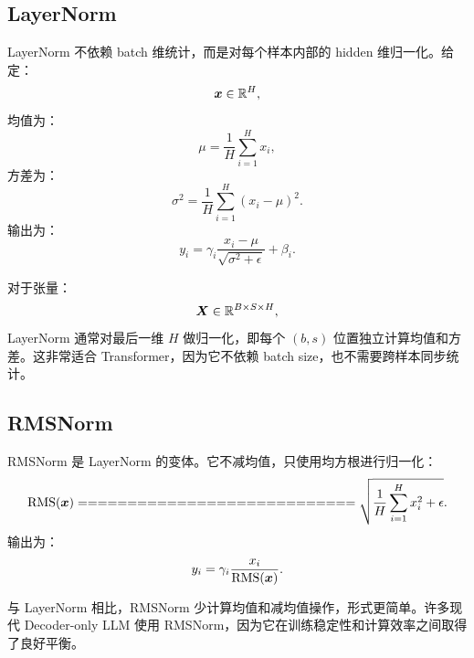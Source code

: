 \subsection{LayerNorm}
\label{subsec:layernorm}

LayerNorm 不依赖 batch 维统计，而是对每个样本内部的 hidden 维归一化。给定：
\[
\bm{x}\in\mathbb{R}^{H},
\]
均值为：
\[
\mu=\frac{1}{H}\sum_{i=1}^{H}x_i,
\]
方差为：
\[
\sigma^2=\frac{1}{H}\sum_{i=1}^{H}(x_i-\mu)^2.
\]
输出为：
\[
y_i=\gamma_i\frac{x_i-\mu}{\sqrt{\sigma^2+\epsilon}}+\beta_i.
\]

对于张量：
\[
\bm{X}\in\mathbb{R}^{B\times S\times H},
\]
LayerNorm 通常对最后一维 $H$ 做归一化，即每个 $(b,s)$ 位置独立计算均值和方差。这非常适合 Transformer，因为它不依赖 batch size，也不需要跨样本同步统计。

\subsection{RMSNorm}
\label{subsec:rmsnorm}

RMSNorm 是 LayerNorm 的变体。它不减均值，只使用均方根进行归一化：
\[
\operatorname{RMS}(\vect{x})
============================

\sqrt{
\frac{1}{H}\sum_{i=1}^{H}x_i^2+\epsilon
}.
\]
输出为：
\[
y_i=\gamma_i\frac{x_i}{\operatorname{RMS}(\bm{x})}.
\]

与 LayerNorm 相比，RMSNorm 少计算均值和减均值操作，形式更简单。许多现代 Decoder-only LLM 使用 RMSNorm，因为它在训练稳定性和计算效率之间取得了良好平衡。

